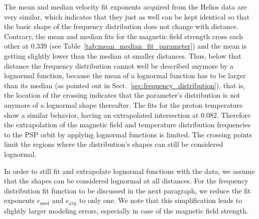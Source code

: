 \documentclass[]{aa}
\begin{document}
	The mean and median velocity fit exponents acquired from the Helios data are very similar, which indicates that they just as well can be kept identical so that the basic shape of the frequency distribution does not change with distance. Contrary, the mean and median fits for the magnetic field strength cross each other at \SI{0.339}{\au} (see Table~\ref{tab:mean_median_fit_parameter}) and the mean is getting slightly lower than the median at smaller distances. Thus, below that distance the frequency distribution cannot well be described anymore by a lognormal function, because the mean of a lognormal function has to be larger than its median (as pointed out in Sect.~\ref{sec:frequency_distribution}), that is, the location of the crossing indicates that the parameter's distribution is not anymore of a lognormal shape thereafter. The fits for the proton temperature show a similar behavior, having an extrapolated intersection at \SI{0.082}{\au}. Therefore the extrapolation of the magnetic field and temperature distribution frequencies to the PSP orbit by applying lognormal functions is limited. The crossing points limit the regions where the distribution's shapes can still be considered lognormal.

	In order to still fit and extrapolate lognormal functions with the data, we assume that the shapes can be considered lognormal at all distances. For the frequency distribution fit function to be discussed in the next paragraph, we reduce the fit exponents $e_\text{med}$ and $e_\text{avg}$ to only one. We note that this simplification leads to slightly larger modeling errors, especially in case of the magnetic field strength.
\end{document}

